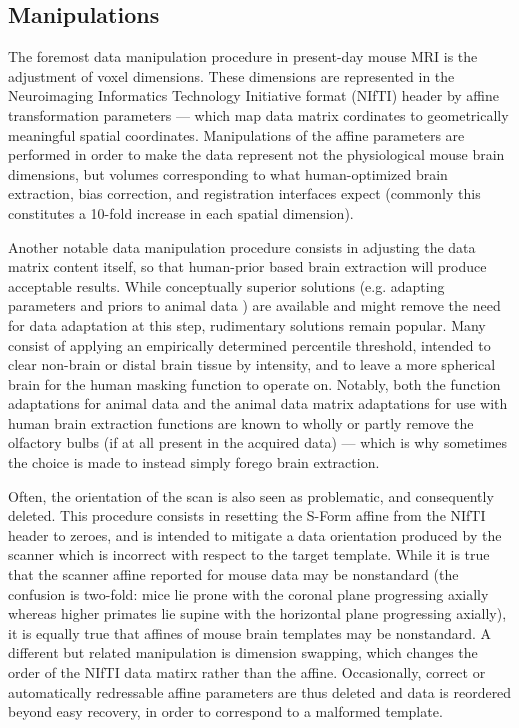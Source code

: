 \subsection{Manipulations}
The foremost data manipulation procedure in present-day mouse MRI is the adjustment of voxel dimensions.
These dimensions are represented in the Neuroimaging Informatics Technology Initiative format (NIfTI) header \cite{nifti} by affine transformation parameters --- which map data matrix cordinates to geometrically meaningful spatial coordinates.
Manipulations of the affine parameters are performed in order to make the data represent not the physiological mouse brain dimensions, but volumes corresponding to what human-optimized brain extraction, bias correction, and registration interfaces expect (commonly this constitutes a 10-fold increase in each spatial dimension).

Another notable data manipulation procedure consists in adjusting the data matrix content itself, so that human-prior based brain extraction will produce acceptable results.
While conceptually superior solutions (e.g. adapting parameters and priors to animal data \cite{rbet,Oguz2014}) are available and might remove the need for data adaptation at this step, rudimentary solutions remain popular.
Many consist of applying an empirically determined percentile threshold, intended to clear non-brain or distal brain tissue by intensity, and to leave a more spherical brain for the human masking function to operate on.
Notably, both the function adaptations for animal data and the animal data matrix adaptations for use with human brain extraction functions are known to wholly or partly remove the olfactory bulbs (if at all present in the acquired data) --- which is why sometimes the choice is made to instead simply forego brain extraction.

Often, the orientation of the scan is also seen as problematic, and consequently deleted.
This procedure consists in resetting the S-Form affine from the NIfTI header to zeroes, and is intended to mitigate a data orientation produced by the scanner which is incorrect with respect to the target template.
While it is true that the scanner affine reported for mouse data may be nonstandard (the confusion is two-fold: mice lie prone with the coronal plane progressing axially whereas higher primates lie supine with the horizontal plane progressing axially), it is equally true that affines of mouse brain templates may be nonstandard.
A different but related manipulation is dimension swapping, which changes the order of the NIfTI data matirx rather than the affine.
Occasionally, correct or automatically redressable affine parameters are thus deleted and data is reordered beyond easy recovery, in order to correspond to a malformed template.

